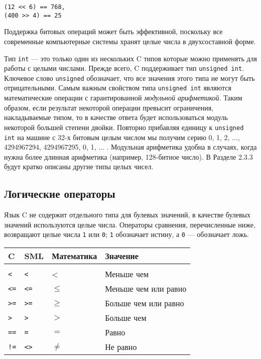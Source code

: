\begin{lstlisting}
(12 << 6) == 768,
(400 >> 4) == 25
\end{lstlisting}

Поддержка битовых операций может быть эффективной, поскольку все современные компьютерные системы хранят целые числа в двухсоставной форме.

Тип \lstinline|int| --- это только один из нескольких C типов которые можно применять для работы с целыми числами. Прежде всего, C поддерживает тип \lstinline|unsigned int|. Ключевое слово \lstinline|unsigned| обозначает, что все значения этого типа не могут быть отрицательными. Самым важным свойством типа \lstinline|unsigned int| являются математические операции с гарантированной \emph{модульной арифметикой}. Таким образом, если результат некоторой операции превысит ограничения, накладываемые типом, то в качестве ответа будет использоваться модуль некоторой большей степени двойки. Повторно прибавляя единицу к \lstinline|unsigned int| на машине с 32-х битовым целым числом мы получим серию 0, 1, 2, ..., 4294967294, 4294967295, 0, 1, ... . Модульная арифметика удобна в случаях, когда нужна более длинная арифметика (например, 128-битное число). В Разделе 2.3.3 будут кратко описаны другие типы целых чисел.

\subsection{Логические операторы}\label{logicOperators}

Язык C не содержит отдельного типа для булевых значений, в качестве булевых значений используются целые числа. Операторы сравнения, перечисленные ниже, возвращают целые числа \lstinline|1| или \lstinline|0|; \lstinline|1| обозначает истину, а \lstinline|0| --- обозначает ложь.

\begin{tabular}{llll}
  \hline \hline
  C & SML & Математика & Значение \\ \hline \\
  \lstinline|<| & \lstinline|<| & < & Меньше чем \\
  \lstinline|<=| & \lstinline|<=| & $\le$ & Меньше чем или равно \\
  \lstinline|>=| & \lstinline|>=| & $\ge$ & Больше чем или равно \\
  \lstinline|>| & \lstinline|>| & $>$ & Больше чем \\
  \lstinline|==| & \lstinline|=| & $=$ & Равно \\
  \lstinline|!=| & \lstinline|<>| & $\ne$ & Не равно \\
  \hline \hline
\end{tabular}

